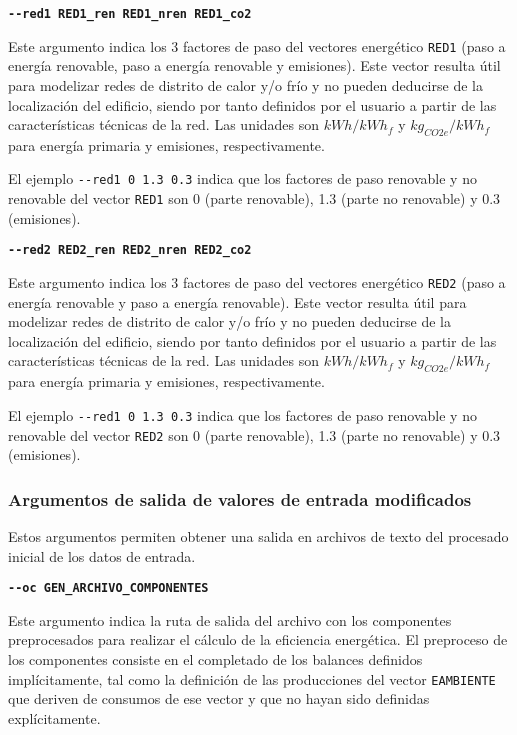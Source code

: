 \documentclass[10pt,notitlepage,oneside,a4paper]{article}
\begin{document}
\textbf{\texttt{-{}-red1 RED1\_ren RED1\_nren RED1\_co2}}

Este argumento indica los 3 factores de paso del vectores energético \texttt{RED1} (paso a energía renovable, paso a energía renovable y emisiones). Este vector resulta útil para modelizar redes de distrito de calor y/o frío y no pueden deducirse de la localización del edificio, siendo por tanto definidos por el usuario a partir de las características técnicas de la red. Las unidades son $kWh/kWh_f$ y $kg_{CO2e}/kWh_f$ para energía primaria y emisiones, respectivamente.

El ejemplo \texttt{-{}-red1 0 1.3 0.3} indica que los factores de paso renovable y no renovable del vector \texttt{RED1} son 0 (parte renovable), 1.3 (parte no renovable) y 0.3 (emisiones).

\textbf{\texttt{-{}-red2 RED2\_ren RED2\_nren RED2\_co2}}

Este argumento indica los 3 factores de paso del vectores energético \texttt{RED2} (paso a energía renovable y paso a energía renovable). Este vector resulta útil para modelizar redes de distrito de calor y/o frío y no pueden deducirse de la localización del edificio, siendo por tanto definidos por el usuario a partir de las características técnicas de la red. Las unidades son $kWh/kWh_f$ y $kg_{CO2e}/kWh_f$ para energía primaria y emisiones, respectivamente.

El ejemplo \texttt{-{}-red1 0 1.3 0.3} indica que los factores de paso renovable y no renovable del vector \texttt{RED2} son 0 (parte renovable), 1.3 (parte no renovable) y 0.3 (emisiones).

\subsubsection{Argumentos de salida de valores de entrada modificados}

Estos argumentos permiten obtener una salida en archivos de texto del procesado inicial de los datos de entrada.

\textbf{\texttt{-{}-oc GEN\_ARCHIVO\_COMPONENTES}}

Este argumento indica la ruta de salida del archivo con los componentes preprocesados para realizar el cálculo de la eficiencia energética. El preproceso de los componentes consiste en el completado de los balances definidos implícitamente, tal como la definición de las producciones del vector \texttt{EAMBIENTE} que deriven de consumos de ese vector y que no hayan sido definidas explícitamente.
\end{document}
